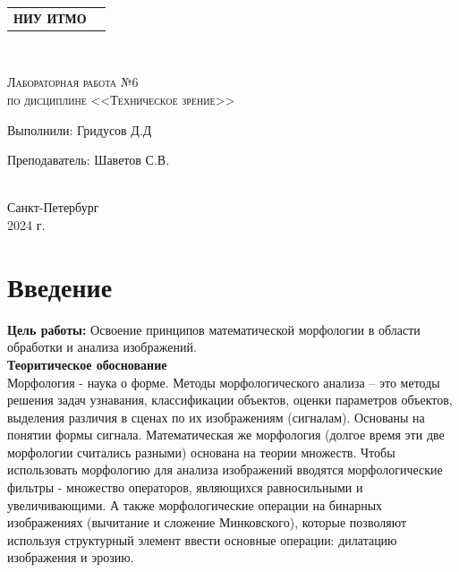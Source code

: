 


\begin{titlepage}
    \newpage
    \begin{center}
        \begin{tabular}{cc}
            \parbox{12cm}{\centering \textbf{НИУ ИТМО}} \\
            \\
            \hline
            \hline
        \end{tabular}
    \end{center}

    \begin{center}
        \\
    \end{center}

    \vspace{1cm}

    \begin{center}
        \textsc{Лабораторная работа №6 \\ по дисциплине <<Техническое зрение>>}
    \end{center}

    \vspace{8em}

    \noindent Выполнили:  \hfill Гридусов Д.Д

    \vspace{20pt}

    \noindent Преподаватель: \hfill Шаветов С.В. \\
    \\
    \vfill

    \begin{center}
        Санкт-Петербург \\2024 г.
    \end{center}

\end{titlepage}

\tableofcontents
\newpage
\section{Введение}

\noindent \textbf{Цель работы:} Освоение принципов математической морфологии в области обработки и анализа изображений.
\\
\noindent \textbf{Теоритическое обоснование}
\\
\noindent Морфология - наука о форме. Методы морфологического анализа – это методы решения задач
узнавания, классификации объектов, оценки параметров объектов,
выделения различия в сценах по их изображениям (сигналам). Основаны
на понятии формы сигнала. Математическая же морфология (долгое время эти две морфологии считались разными) основана на теории множеств. Чтобы использовать морфологию для анализа изображений вводятся морфологические фильтры - множество операторов, являющихся равносильными и увеличивающими. А также морфологические операции на бинарных изображениях (вычитание и сложение Минковского), которые позволяют используя структурный элемент ввести основные операции: дилатацию изображения и эрозию.
